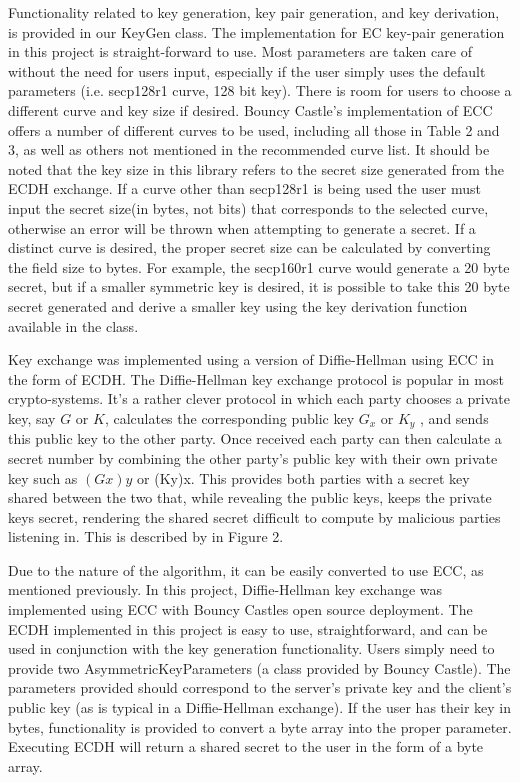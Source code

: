 Functionality related to key generation, key pair generation, and key derivation, is provided in our KeyGen class. The implementation for EC key-pair generation in this project is straight-forward to use. Most parameters are taken care of without the need for users input, especially if the user simply uses the default parameters (i.e. secp128r1 curve, 128 bit key). There is room for users to choose a different curve and key size if desired. Bouncy Castle's implementation of ECC offers a number of different curves to be used, including all those in Table 2 and 3, as well as others not mentioned in the recommended curve list. It should be noted that the key size in this library refers to the secret size generated from the ECDH exchange. If a curve other than secp128r1 is being used the user must input the secret size(in bytes, not bits) that corresponds to the selected curve, otherwise an error will be thrown when attempting to generate a secret. If a distinct curve is desired, the proper secret size can be calculated by converting the field size to bytes. For example, the secp160r1 curve would generate a 20 byte secret, but if a smaller symmetric key is desired, it is possible to take this 20 byte secret generated and derive a smaller key using the key derivation function available in the class.

Key exchange was implemented using a version of Diffie-Hellman using ECC in the form of ECDH. The Diffie-Hellman key exchange protocol is popular in most crypto-systems. It's a rather clever protocol in which each party chooses a private key, say $G$ or $K$, calculates the corresponding public key $G_x$  or $K_y$ , and sends this public key to the other party. Once received each party can then calculate a secret number by combining the other party's public key with their own private key such as $(Gx)y$ or (Ky)x. This provides both parties with a secret key shared between the two that, while revealing the public keys, keeps the private keys secret, rendering the shared secret difficult to compute by malicious parties listening in. This is described by in Figure 2. 

Due to the nature of the algorithm, it can be easily converted to use ECC, as mentioned previously. In this project, Diffie-Hellman key exchange was implemented using ECC with Bouncy Castles open source deployment. The ECDH  implemented in this project is easy to use, straightforward, and can be used in conjunction with the key generation functionality. Users simply need to provide two AsymmetricKeyParameters (a class provided by Bouncy Castle). The parameters provided should correspond to the server's private key and the client's public key (as is typical in a Diffie-Hellman exchange). If the user has their key in bytes, functionality is provided to convert a byte array into the proper parameter. Executing ECDH will return a shared secret to the user in the form of a byte array.

